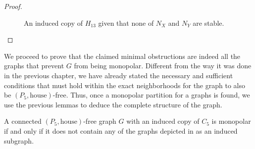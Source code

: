 \begin{proof}
\begin{enumerate}[label=(\roman*)]
\begin{figure}[htb!]
                \caption{An induced copy of $H_{13}$ given that none of $N_X$
                    and $N_Y$ are stable.}
                \label{fig:types_4}
            \end{figure}
    \end{enumerate}
\end{proof}

We proceed to prove that the claimed minimal obstructions are indeed all the
graphs that prevent $G$ from being monopolar. Different from the way it was done
in the previous chapter, we have already stated the necessary and sufficient
conditions that must hold within the exact neighborhoods for the graph to also
be $(P_5,\text{house})$-free. Thus, once a monopolar partition for a graphs is
found, we use the previous lemmas to deduce the complete structure of the graph. 

\begin{theorem}
    \label{thm:monopolar_c5}
    A connected $(P_5,\text{house})$-free graph $G$ with an induced copy of
    $C_5$ is monopolar if and only if it does not contain any of the graphs
    depicted in
     as
    an induced subgraph.
\end{theorem}

